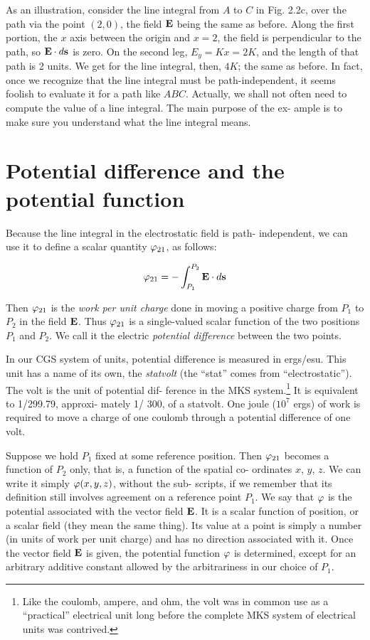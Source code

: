 As an illustration, consider the line integral from $A$ to $C$ in Fig. 2.2c,
over the path via the point $(2,0)$, the field $\mathbf{E}$ being the same as before.
Along the first portion, the $x$ axis between the origin and $x = 2$, the
field is perpendicular to the path, so $\mathbf{E}\cdot d\mathbf{s}$ is zero. On the second leg,
$E_y = Kx = 2K$, and the length of that path is 2 units. We get for the
line integral, then, $4K$; the same as before. In fact, once we recognize
that the line integral must be path-independent, it seems foolish to
evaluate it for a path like $ABC$. Actually, we shall not often need to
compute the value of a line integral. The main purpose of the ex-
ample is to make sure you understand what the line integral means.

\section{Potential difference and the potential function}
Because the line integral in the electrostatic field is path-
independent, we can use it to define a scalar quantity $\varphi_{21}$, as follows:
\begin{framed}
\begin{equation}
  \varphi_{21} = -\int_{P_1}^{P_2} \mathbf{E}\cdot d\mathbf{s}
\end{equation}
\end{framed}
Then $\varphi_{21}$ is the \emph{work per unit charge} done in moving a positive
charge from $P_1$ to $P_2$ in the field $\mathbf{E}$. Thus $\varphi_{21}$ is a single-valued scalar
function of the two positions $P_1$ and $P_2$. We call it the electric
\emph{potential difference} between the two points.

In our CGS system of units, potential difference is measured in
ergs/esu. This unit has a name of its own, the \emph{statvolt} (the ``stat''
comes from ``electrostatic''). The volt is the unit of potential dif-
ference in the MKS system.\footnote{Like the coulomb, ampere, and
ohm, the volt was in common use as a ``practical''
electrical unit long before the complete MKS system of electrical units was contrived.}
It is equivalent to 1/299.79, approxi-
mately 1/ 300, of a statvolt. One joule ($10^7$ ergs) of work is required
to move a charge of one coulomb through a potential difference of
one volt.

Suppose we hold $P_1$ fixed at some reference position. Then $\varphi_{21}$
becomes a function of $P_2$ only, that is, a function of the spatial co-
ordinates $x$, $y$, $z$. We can write it simply $\varphi(x,y,z)$, without the sub-
scripts, if we remember that its definition still involves agreement
on a reference point $P_1$. We say that $\varphi$ is the potential associated with
the vector field $\mathbf{E}$. It is a scalar function of position, or a scalar field
(they mean the same thing). Its value at a point is simply a number
(in units of work per unit charge) and has no direction associated
with it. Once the vector field $\mathbf{E}$ is given, the potential function $\varphi$
is determined, except for an arbitrary additive constant allowed by
the arbitrariness in our choice of $P_1$.

